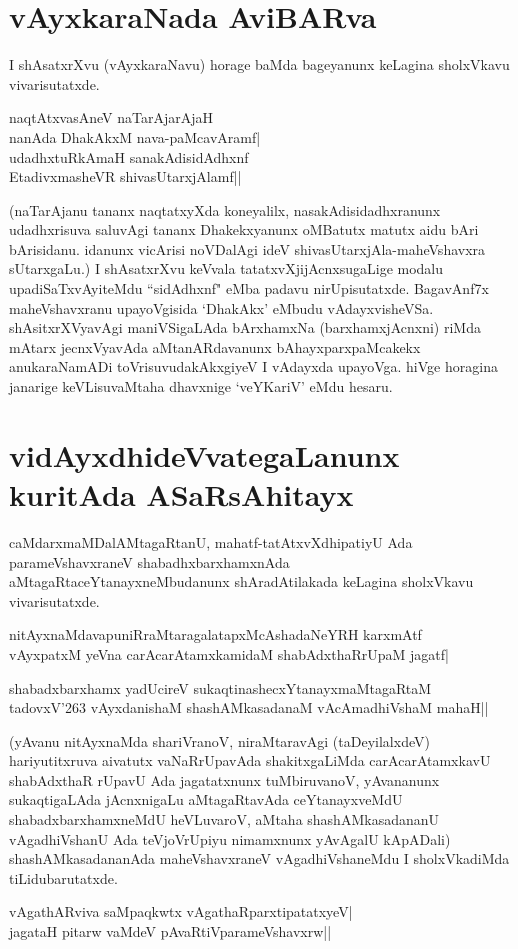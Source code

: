 \section*{vAyxkaraNada AviBARva}

I shAsatxrXvu (vAyxkaraNavu) horage baMda bageyanunx keLagina sholxVkavu vivarisutatxde.
\begin{shloka}
naqtAtxvasAneV naTarAjarAjaH\label{30}\\
nanAda DhakAkxM nava-paMcavAramf|\\
udadhxtuRkAmaH sanakAdisidAdhxnf\\
EtadivxmasheVR shivasUtarxjAlamf||
\end{shloka}

(naTarAjanu tananx naqtatxyXda koneyalilx, nasakAdisidadhxranunx udadhxrisuva saluvAgi tananx Dhakekxyanunx oMBatutx matutx aidu bAri bArisidanu. idanunx vicArisi noVDalAgi ideV shivasUtarxjAla-maheVshavxra sUtarxgaLu.) I shAsatxrXvu keVvala tatatxvXjijAcnxsugaLige modalu upadiSaTxvAyiteMdu ``sidAdhxnf" eMba padavu nirUpisutatxde. BagavAnf7x maheVshavxranu upayoVgisida `DhakAkx' eMbudu vAdayxvisheVSa. shAsitxrXVyavAgi maniVSigaLAda bArxhamxNa (barxhamxjAcnxni) riMda mAtarx jecnxVyavAda aMtanARdavanunx bAhayxparxpaMcakekx anukaraNamADi toVrisuvudakAkxgiyeV I vAdayxda upayoVga. hiVge horagina janarige keVLisuvaMtaha dhavxnige `veYKariV' eMdu hesaru.

\section*{vidAyxdhideVvategaLanunx kuritAda ASaRsAhitayx}

caMdarxmaMDalAMtagaRtanU, mahatf-tatAtxvXdhipatiyU Ada parameVshavxraneV shabadhxbarxhamxnAda aMtagaRtaceYtanayxneMbudanunx shAradAtilakada keLagina sholxVkavu vivarisutatxde.

\begin{shloka}
nitAyxnaMdavapuniRraMtaragalatapxMcAshadaNeYRH karxmAtf\label{31}\\
vAyxpatxM yeVna carAcarAtamxkamidaM shabAdxthaRrUpaM jagatf|
\end{shloka}
\begin{shloka}
shabadxbarxhamx yadUcireV sukaqtinashecxYtanayxmaMtagaRtaM\\
tadovxV\char'263 vAyxdanishaM shashAMkasadanaM vAcAmadhiVshaM mahaH||
\end{shloka}

(yAvanu nitAyxnaMda shariVranoV, niraMtaravAgi (taDeyilalxdeV) hariyutitxruva aivatutx vaNaRrUpavAda shakitxgaLiMda carAcarAtamxkavU shabAdxthaR rUpavU Ada jagatatxnunx tuMbiruvanoV, yAvananunx sukaqtigaLAda jAcnxnigaLu aMtagaRtavAda ceYtanayxveMdU shabadxbarxhamxneMdU heVLuvaroV, aMtaha shashAMkasadananU vAgadhiVshanU Ada teVjoVrUpiyu nimamxnunx yAvAgalU kApADali) shashAMkasadananAda maheVshavxraneV vAgadhiVshaneMdu I sholxVkadiMda tiLidubarutatxde.
\begin{shloka}
vAgathARviva saMpaqkwtx vAgathaRparxtipatatxyeV|\label{31b}\\
jagataH pitarw vaMdeV pAvaRtiVparameVshavxrw||
\end{shloka}

